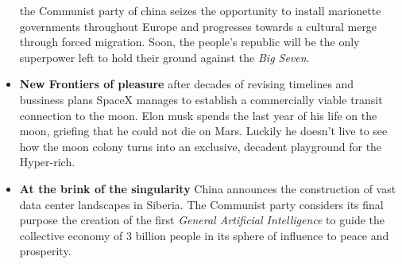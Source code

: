 \documentclass[11pt,a4paper, twocolumn]{article}
\begin{document}
\begin{itemize}
        the Communist party of china seizes the opportunity to install marionette governments throughout
        Europe and progresses towards a cultural merge through forced migration. Soon, the people's republic will be the
        only superpower left to hold their ground against the \textit{Big Seven}.
    \item \textbf{New Frontiers of pleasure} after decades of revising timelines and bussiness plans SpaceX manages
        to establish a commercially viable transit connection to the moon. Elon musk spends the last year of his life
        on the moon, griefing that he could not die on Mars. Luckily he doesn't live to see how the moon colony turns
        into an exclusive, decadent playground for the Hyper-rich.
    \item \textbf{At the brink of the singularity} China announces the construction of vast
        data center landscapes in Siberia. The Communist party considers its final purpose the creation of the first
        \textit{General Artificial Intelligence} to guide the collective economy of 3 billion people in its sphere of
        influence to peace and prosperity.
    \end{itemize}
\end{document}
